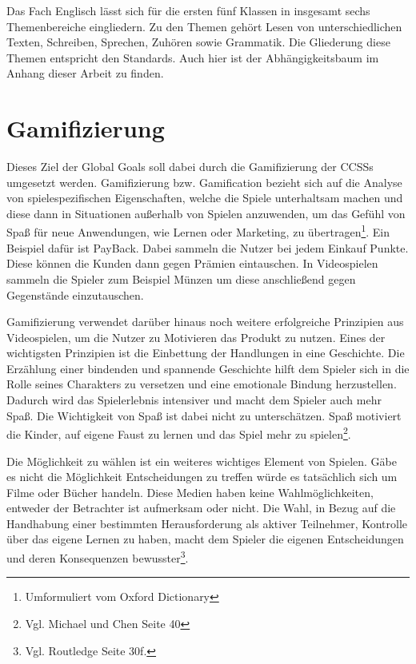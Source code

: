 Das Fach Englisch lässt sich für die ersten fünf Klassen in insgesamt sechs Themenbereiche eingliedern. Zu den Themen gehört Lesen von unterschiedlichen Texten, Schreiben, Sprechen, Zuhören sowie Grammatik. Die Gliederung diese Themen entspricht den Standards. Auch hier ist der Abhängigkeitsbaum im Anhang dieser Arbeit zu finden.

\section{Gamifizierung}
Dieses Ziel der Global Goals soll dabei durch die Gamifizierung der \acp{CCSS} umgesetzt werden. Gamifizierung bzw. Gamification bezieht sich auf die Analyse von spielespezifischen Eigenschaften, welche die Spiele unterhaltsam machen und diese dann in Situationen außerhalb von Spielen anzuwenden, um das Gefühl von Spaß für neue Anwendungen, wie Lernen oder Marketing, zu übertragen\footnote{Umformuliert vom Oxford Dictionary}. Ein Beispiel dafür ist PayBack. Dabei sammeln die Nutzer bei jedem Einkauf Punkte. Diese können die Kunden dann gegen Prämien eintauschen. In Videospielen sammeln die Spieler zum Beispiel Münzen um diese anschließend gegen Gegenstände einzutauschen. 

Gamifizierung verwendet darüber hinaus noch weitere erfolgreiche Prinzipien aus Videospielen, um die Nutzer zu Motivieren das Produkt zu nutzen. Eines der wichtigsten Prinzipien ist die Einbettung der Handlungen in eine Geschichte. Die Erzählung einer bindenden und spannende Geschichte hilft dem Spieler sich in die Rolle seines Charakters zu versetzen und eine emotionale Bindung herzustellen. Dadurch wird das Spielerlebnis intensiver und macht dem Spieler auch mehr Spaß. Die Wichtigkeit von Spaß ist dabei nicht zu unterschätzen. Spaß motiviert die Kinder, auf eigene Faust zu lernen und das Spiel mehr zu spielen\footnote{Vgl. Michael und Chen \cite{seriousGamesFun} Seite 40}.

Die Möglichkeit zu wählen ist ein weiteres wichtiges Element von Spielen. Gäbe es nicht die Möglichkeit Entscheidungen zu treffen würde es tatsächlich sich um Filme oder Bücher handeln. Diese Medien haben keine Wahlmöglichkeiten, entweder der Betrachter ist aufmerksam oder nicht. Die Wahl, in Bezug auf die Handhabung einer bestimmten Herausforderung als aktiver Teilnehmer, Kontrolle über das eigene Lernen zu haben, macht dem Spieler die eigenen Entscheidungen und deren Konsequenzen bewusster\footnote{Vgl. Routledge \cite{seriousGamesPrinciples} Seite 30f.}.

